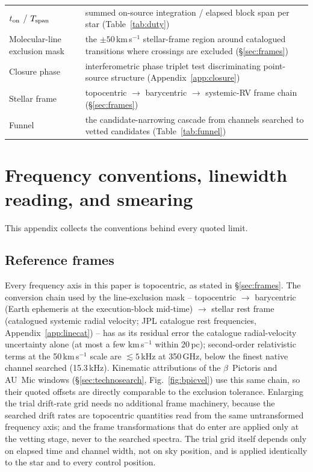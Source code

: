 \documentclass{openjournal}
\begin{document}
\begin{table}
\begin{tabularx}{\textwidth}{@{}lX@{}}
$t_{\rm on}$ / $T_{\rm span}$ & summed on-source integration / elapsed block span per star (Table~\ref{tab:duty}) \\
Molecular-line exclusion mask & the $\pm50$\,km\,s$^{-1}$ stellar-frame region around catalogued transitions where crossings are excluded (\S\ref{sec:frames}) \\
Closure phase & interferometric phase triplet test discriminating point-source structure (Appendix~\ref{app:closure}) \\
Stellar frame & topocentric $\rightarrow$ barycentric $\rightarrow$ systemic-RV frame chain (\S\ref{sec:frames}) \\
Funnel & the candidate-narrowing cascade from channels searched to vetted candidates (Table~\ref{tab:funnel}) \\
\hline
\end{tabularx}
\end{table}

\section{Frequency conventions, linewidth reading, and smearing}
\label{app:conventions}

This appendix collects the conventions behind every quoted limit.

\subsection*{Reference frames}

Every frequency axis in this paper is topocentric, as stated in
\S\ref{sec:frames}. The conversion chain used by the line-exclusion
mask -- topocentric $\rightarrow$ barycentric (Earth ephemeris at the
execution-block mid-time) $\rightarrow$ stellar rest frame (catalogued
systemic radial velocity; JPL catalogue rest frequencies,
Appendix~\ref{app:linecat}) -- has as its residual error the catalogue
radial-velocity uncertainty alone (at most a few km\,s$^{-1}$ within
20\,pc); second-order relativistic terms at the 50\,km\,s$^{-1}$ scale
are $\lesssim5$\,kHz at 350\,GHz, below the finest native channel
searched (15.3\,kHz). Kinematic attributions of the $\beta$~Pictoris
and AU~Mic windows (\S\ref{sec:technosearch}, Fig.~\ref{fig:bpicvel})
use this same chain, so their quoted offsets are directly comparable
to the exclusion tolerance. Enlarging the trial drift-rate grid needs
no additional frame machinery, because the searched drift rates are
topocentric quantities read from the same untransformed frequency
axis; and the frame transformations that do enter are applied only at
the vetting stage, never to the searched spectra. The trial grid
itself depends only on elapsed time and channel width, not on sky
position, and is applied identically to the star and to every control
position.
\end{document}
